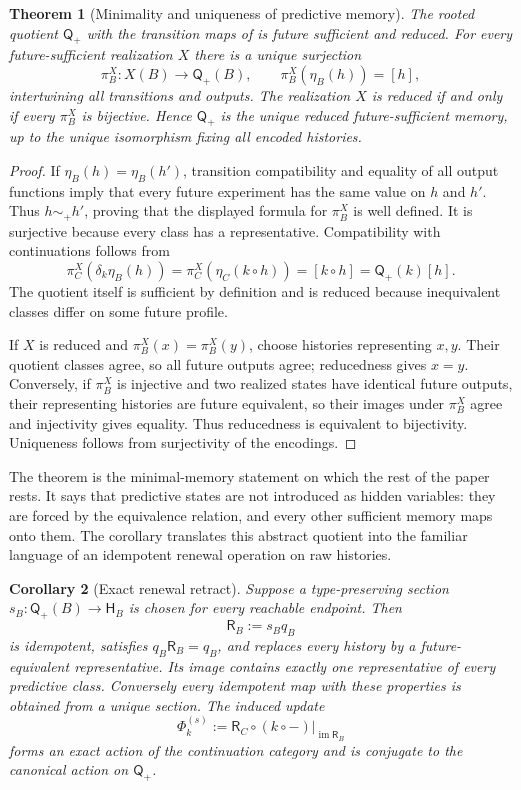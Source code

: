 \documentclass[11pt]{article}
\newtheorem{theorem}{Theorem}[section]
\newtheorem{corollary}[theorem]{Corollary}
\theoremstyle{definition}
\theoremstyle{remark}
\newcommand{\Qq}{\mathsf Q}
\begin{document}
\begin{theorem}[Minimality and uniqueness of predictive memory]
\label{thm:minimal-predictive-memory}
The rooted quotient $\Qq_+$ with the transition maps of
 is future sufficient and reduced.  For every
future-sufficient realization $X$ there is a unique surjection
\[
 \pi_B^X:X(B)\longrightarrow\Qq_+(B),
 \qquad
 \pi_B^X(\eta_B(h))=[h],
\]
intertwining all transitions and outputs.  The realization $X$ is reduced if
and only if every $\pi_B^X$ is bijective.  Hence $\Qq_+$ is the unique reduced
future-sufficient memory, up to the unique isomorphism fixing all encoded
histories.
\end{theorem}

\begin{proof}
If $\eta_B(h)=\eta_B(h')$, transition compatibility and equality of all output
functions imply that every future experiment has the same value on $h$ and
$h'$.  Thus $h\sim_+h'$, proving that the displayed formula for $\pi_B^X$ is
well defined.  It is surjective because every class has a representative.
Compatibility with continuations follows from
\[
 \pi_C^X(\delta_k\eta_B(h))
 =\pi_C^X(\eta_C(k\circ h))
 =[k\circ h]
 =\Qq_+(k)[h].
\]
The quotient itself is sufficient by definition and is reduced because
inequivalent classes differ on some future profile.

If $X$ is reduced and $\pi_B^X(x)=\pi_B^X(y)$, choose histories representing
$x,y$.  Their quotient classes agree, so all future outputs agree; reducedness
gives $x=y$.  Conversely, if $\pi_B^X$ is injective and two realized states have
identical future outputs, their representing histories are future equivalent,
so their images under $\pi_B^X$ agree and injectivity gives equality.  Thus
reducedness is equivalent to bijectivity.  Uniqueness follows from surjectivity
of the encodings.
\end{proof}

The theorem is the minimal-memory statement on which the rest of the paper rests.
It says that predictive states are not introduced as hidden variables: they are
forced by the equivalence relation, and every other sufficient memory maps onto
them.  The corollary translates this abstract quotient into the familiar language
of an idempotent renewal operation on raw histories.

\begin{corollary}[Exact renewal retract]
\label{cor:renewal-retract}
Suppose a type-preserving section
$s_B:\Qq_+(B)\to\mathsf H_B$ is chosen for every reachable endpoint.  Then
\[
 \mathsf R_B:=s_Bq_B
\]
is idempotent, satisfies $q_B\mathsf R_B=q_B$, and replaces every history by a
future-equivalent representative.  Its image contains exactly one representative
of every predictive class.  Conversely every idempotent map with these
properties is obtained from a unique section.  The induced update
\[
 \Phi_k^{(s)}:=\mathsf R_C\circ(k\circ-)\big|_{\operatorname{im}\mathsf R_B}
\]
forms an exact action of the continuation category and is conjugate to the
canonical action on $\Qq_+$.
\end{corollary}
\end{document}
